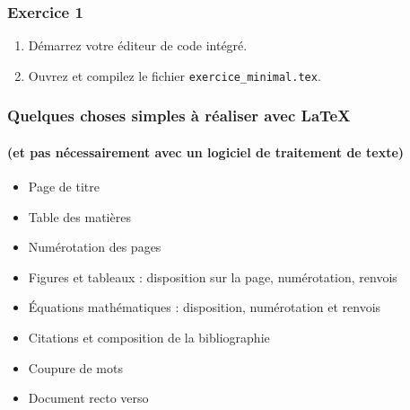 
\begin{frame}[c]
	
	\frametitle{Exercice 1}
	
	\begin{enumerate}
		\item Démarrez votre éditeur de code intégré.
		\item Ouvrez et compilez le fichier \texttt{exercice\_minimal.tex}.
	\end{enumerate}

\end{frame}


\begin{frame}

	\frametitle{Quelques choses simples à réaliser avec {\LaTeX}}
	\framesubtitle{(et pas nécessairement avec un logiciel de traitement de texte)}
	
	\begin{itemize}
		\item Page de titre
		\item Table des matières
		\item Numérotation des pages
		\item Figures et tableaux : disposition sur la page, numérotation, renvois
		\item Équations mathématiques : disposition, numérotation et renvois
		\item Citations et composition de la bibliographie
		\item Coupure de mots
		\item Document recto verso
	\end{itemize}

\end{frame}

